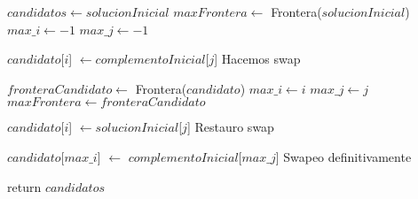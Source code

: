 \begin{algorithm}[H]
\begin{algorithmic}

    \State $candidatos \gets solucionInicial$
    \State $maxFrontera \gets$ Frontera($solucionInicial$)
    \State $max\_i \gets -1$
    \State $max\_j \gets -1$

    \For{$i \in [0..|solucionInicial|)$}
        \For{$j \in [0..|complementoInicial|)$}

            \State $candidato$[$i$] $\gets complementoInicial$[$j$] \Comment Hacemos swap

                \State $fronteraCandidato \gets$ Frontera($candidato$)
                    \State $max\_i \gets i$
                    \State $max\_j \gets j$
                    \State $maxFrontera \gets fronteraCandidato$
                \EndIf
            \EndIf

            \State $candidato$[$i$] $\gets solucionInicial$[$j$] \Comment Restauro swap
        \EndFor
    \EndFor

        \State $candidato$[$max\_i$] $\gets$ $complementoInicial$[$max\_j$] \Comment Swapeo definitivamente
    \EndIf

    \State return $candidatos$

\EndFunction
\end{algorithmic}
\end{algorithm}



\begin{algorithm}[H]
\begin{algorithmic}


\EndFunction
\end{algorithmic}
\end{algorithm}


